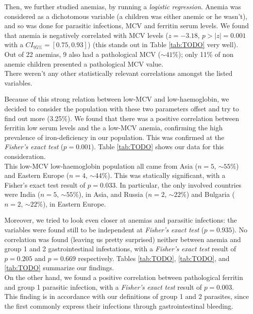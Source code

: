 Then, we further studied anemias, by running a \textit{logistic regression}. Anemia was considered as a dichotomous variable (a children was either anemic or he wasn't), and so was done for parasitic infections, MCV and ferritin serum levels. We found that anemia is negatively correlated with MCV levels ($z=-3.18$, $p>|z|=0.001$ with a $CI_{95\%} =[0.75,0.93]$) (this stands out in Table \ref{tab:TODO} very well). Out of 22 anemias, 9 also had a pathological MCV ($\sim 41\%$); only 11\% of non anemic children presented a pathological MCV value.\\
There weren't any other statistically relevant correlations amongst the listed variables.


Because of this strong relation between low-MCV and low-haemoglobin, we decided to consider the population with these two parameters offset and try to find out more (3.25\%). We found that there was a positive correlation between ferritin low serum levels and the a low-MCV anemia, confirming the high prevalence of iron-deficiency in our population. This was confirmed at the \textit{Fisher's exact test} ($p=0.001$). Table \ref{tab:TODO} shows our data for this consideration.\\
This low-MCV low-haemoglobin population all came from Asia ($n=5$, $\sim 55\%$) and Eastern Europe ($n=4$, $\sim 44\%$). This was statically significant, with a Fisher's exact test result of $p=0.033$. In particular, the only involved countries were India ($n=5$, $\sim 55\%$), in Asia, and Russia ($n=2$, $\sim 22\%$) and Bulgaria ($n=2$, $\sim 22\%$), in Eastern Europe.


Moreover, we tried to look even closer at anemias and parasitic infections: the variables were found still to be independent at \textit{Fisher's exact test} ($p=0.935$). No correlation was found (leaving us pretty surprised) neither between anemia and group 1 and 2 gastrointestinal infestations, with a \textit{Fisher's exact test} result of $p=0.205$ and $p=0.669$ respectively. Tables \ref{tab:TODO}, \ref{tab:TODO}, and \ref{tab:TODO} summarize our findings.\\
On the other hand, we found a positive correlation between pathological ferritin and group 1 parasitic infection, with a \textit{Fisher's exact test} result of $p=0.003$. This finding is in accordance with our definitions of group 1 and 2 parasites, since the first commonly express their infections through gastrointestinal bleeding.

